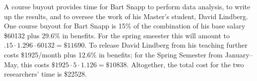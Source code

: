 \documentclass[12pt]{article}
\begin{document}
A course buyout provides time for Bart Snapp to perform data analysis,
to write up the results, and to oversee the work of his Master's
student, David Lindberg.  One course buyout for Bart Snapp is 15\% of the combination of his base salary \$60132 plus 29.6\% in benefits. For the spring smeester this will amount to $.15 \cdot 1.296\cdot 60132=\$11690$.
To release David Lindberg from his teaching further costs \$1925/month
plus 12.6\% in benefits; for the Spring Semester from January--May,
this costs $\$1925 \cdot 5 \cdot 1.126 = \$10838$.  Altogether, the
total cost for the two researchers' time is \$22528.

\pagebreak
\printbibliography
\end{document}
